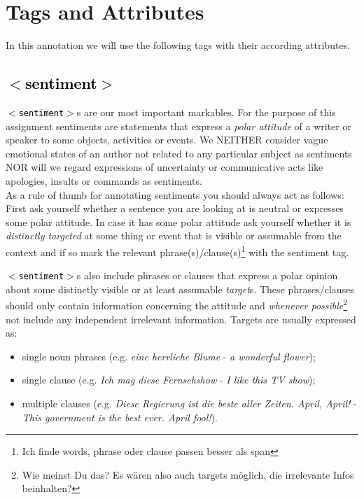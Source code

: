 \documentclass[11pt,a4paper]{article}
\newcommand{\xmltag}[1]{\textcolor{black}{{\small$<$#1$>$}}}
\begin{document}
\section{Tags and Attributes}
In this annotation we will use the following tags with their according
attributes.


\subsection{\xmltag{sentiment}}
\texttt{\xmltag{sentiment}}s are our most important markables. For
the purpose of this assignment sentiments are statements that express a \emph{polar attitude} of a writer or speaker to some objects, activities or events. We NEITHER consider vague emotional states of an author not
related to any particular subject as sentiments NOR will we regard expressions of uncertainty or communicative acts like apologies, insults or
commands as sentiments. \\ 
As a rule of thumb for annotating sentiments you should always act as follows: First ask yourself whether a sentence you are looking at is neutral or expresses some polar attitude. In case it has some polar attitude ask yourself whether it is \emph{distinctly targeted} at some thing or event that is visible or assumable from the context and if so mark the relevant phrase(s)/clause(s)\footnote{Ich finde words, phrase oder clause passen besser als span} with the sentiment tag.

\texttt{\xmltag{sentiment}}s also include phrases or clauses that express
a polar opinion about some distinctly visible or at least assumable
\emph{target}s. These phrases/clauses should only contain information concerning the attitude and \emph{whenever possible}\footnote{Wie meinst Du das? Es w\"aren also auch targets m\"oglich, die irrelevante Infos beinhalten?} not include any independent
irrelevant information. Targets are usually expressed as:
\begin{itemize}
  \item single noun phrases (e.g. \textit{eine herrliche Blume} -
    \textit{a wonderful flower});
  \item single clause (e.g. \textit{Ich mag diese Fernsehshow} -
    \textit{I like this TV show});
  \item multiple clauses (e.g. \textit{Diese Regierung ist die beste
    aller Zeiten. April, April!} - \textit{This government is the best
    ever. April fool!}).
\end{itemize}
\end{document}

